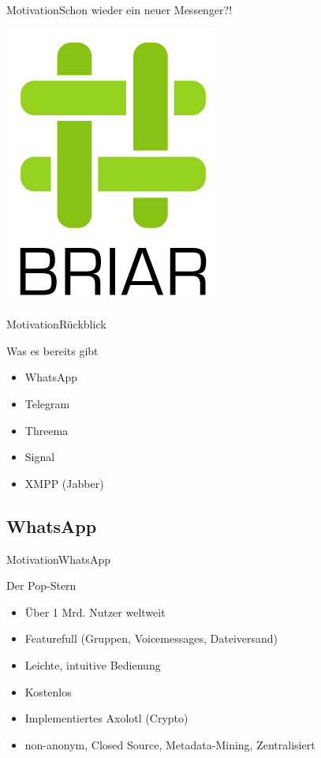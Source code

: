 
\begin{frame}{Motivation}{Schon wieder ein neuer Messenger?!}
	\begin{center}
	\includegraphics[scale=0.3]{res/briar_logo_large.png}
	\end{center}
\end{frame}

\begin{frame}{Motivation}{Rückblick}
	\begin{block}{Was es bereits gibt}
		\begin{itemize}
			\item WhatsApp
			\item Telegram
			\item Threema
			\item Signal
			\item XMPP (Jabber)
		\end{itemize}
	\end{block}
\end{frame}

\subsection{WhatsApp}
\begin{frame}{Motivation}{WhatsApp}
	\begin{block}{Der Pop-Stern}
		\begin{itemize}[<+->]
			\item Über 1 Mrd. Nutzer weltweit
			\item Featurefull (Gruppen, Voicemessages, Dateiversand)
			\item Leichte, intuitive Bedienung
			\item Kostenlos
			\item \color{green} Implementiertes Axolotl (Crypto)
			\item \color{red} non-anonym, Closed Source, Metadata-Mining, Zentralisiert
		\end{itemize}
	\end{block}
\end{frame}

